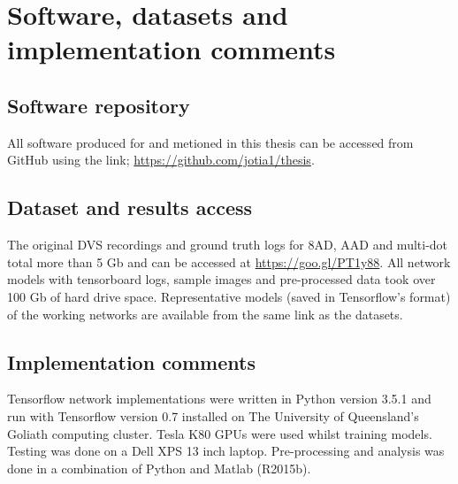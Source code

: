 \chapter{Software, datasets and implementation comments}

\section{Software repository}
All software produced for and metioned in this thesis can be accessed from GitHub using the link; \hyperref[https://github.com/jotia1/thesis]{https://github.com/jotia1/thesis}.

\section{Dataset and results access}
The original DVS recordings and ground truth logs for 8AD, AAD and multi-dot total more than 5 Gb and can be accessed at \hyperref[https://goo.gl/PT1y88]{https://goo.gl/PT1y88}.
All network models with tensorboard logs, sample images and pre-processed data took over 100 Gb of hard drive space.
Representative models (saved in Tensorflow's format) of the working networks are available from the same link as the datasets.

\section{Implementation comments}
Tensorflow network implementations were written in Python version 3.5.1 and run with Tensorflow version 0.7 installed on The University of Queensland's Goliath computing cluster. 
Tesla K80 GPUs were used whilst training models. Testing was done on a Dell XPS 13 inch laptop.
Pre-processing and analysis was done in a combination of Python and Matlab (R2015b).

